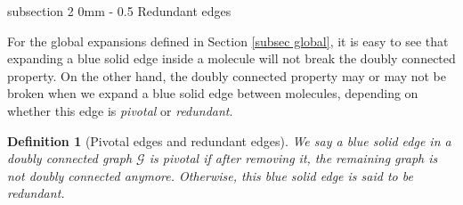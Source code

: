 \documentclass{article}
\makeatletter
\newcommand{\1}{\mathds{1}}
\numberwithin{equation}{section}
\renewcommand{\cal}{\mathcal}
\newcommand{\dashed}{\text{diffusive}}
\theoremstyle{plain} %
\newtheorem{definition}[theorem]{Definition}
\theoremstyle{remark}
\newcommand{\nc}{\normalcolor}
\renewcommand{\subsection}{\@startsection
	{subsection}%
	{2}%
	{0mm}%
	{-\baselineskip}%
	{0.5\baselineskip}%
	{\normalfont\bf\itshape}} %
\makeatother
\begin{document}
 
 \subsection{Redundant edges} 
 
For the global expansions defined in Section \ref{subsec global}, it is easy to see that expanding a blue solid edge inside a molecule will not break the doubly connected property. On the other hand, the doubly connected property may or may not be broken when we expand a blue solid edge between molecules, depending on whether this edge is \emph{pivotal} or \emph{redundant}. %



 
 \begin{definition}[Pivotal edges and redundant edges] \label{defn pivotal}
 We say a blue solid edge in a doubly connected graph $\cal G$ is \emph{pivotal} if after removing it, the remaining graph is not doubly connected anymore. Otherwise, this blue solid edge is said to be \emph{redundant}. %
 \end{definition}
 
\end{document}
